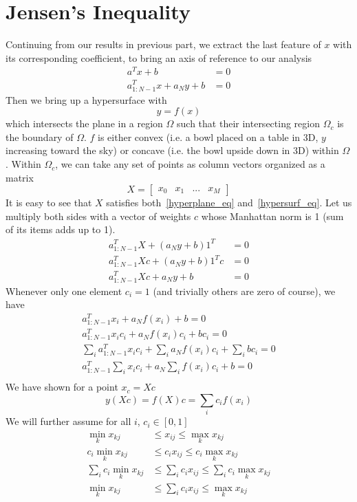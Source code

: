 \documentclass{book}
\numberwithin{equation}{subsection}
\begin{document}
\section{Jensen's Inequality}
Continuing from our results in previous part, we extract the last feature of $x$ with its corresponding coefficient, to bring an axis of reference to our analysis
\begin{align}
    a^Tx+b &= 0\\
    a_{1:N-1}^Tx+a_Ny+b &= 0 \label{hyperplane_eq}
\end{align}
Then we bring up a hypersurface with 
\begin{equation}
    y=f(x) \label{hypersurf_eq}
\end{equation}
which intersects the plane in a region $\Omega$ such that their intersecting region $\Omega_c$ is the boundary of $\Omega$. $f$ is either convex (i.e. a bowl placed on a table in 3D, $y$ increasing toward the sky) or concave (i.e. the bowl upside down in 3D) within $\Omega$. Within $\Omega_c$, we can take any set of points as column vectors organized as a matrix
$$
X = \begin{bmatrix}
    x_0 & x_1 & ... & x_M
\end{bmatrix}
$$
It is easy to see that $X$ satisfies both~\ref{hyperplane_eq} and~\ref{hypersurf_eq}. Let us multiply both sides with a vector of weights $c$ whose Manhattan norm is 1 (sum of its items adds up to 1). 
\begin{align}
    a_{1:N-1}^TX+(a_Ny+b)1^T &= 0\\
    a_{1:N-1}^TXc+(a_Ny+b)1^Tc &= 0\\
    a_{1:N-1}^TXc+a_Ny+b &= 0
\end{align}
Whenever only one element $c_i=1$ (and trivially others are zero of course), we have
\begin{align}
    a_{1:N-1}^Tx_i+a_Nf(x_i)+b = 0\\
    a_{1:N-1}^Tx_ic_i+a_Nf(x_i)c_i+bc_i = 0\\
    \sum_i a_{1:N-1}^Tx_ic_i+\sum_i a_Nf(x_i)c_i+\sum_i bc_i = 0\\
    a_{1:N-1}^T\sum_i x_ic_i+a_N\sum_i f(x_i)c_i+b = 0\\
\end{align}
We have shown for a point $x_c=Xc$ 
\begin{equation}
    y(Xc)=f(X)c=\sum_i c_if(x_i)
\end{equation}
We will further assume for all $i$, $c_i \in [0,1]$
\begin{align}
    \min_kx_{kj} &\leq x_{ij} \leq \max_kx_{kj}\\
    c_i\min_kx_{kj} &\leq c_ix_{ij} \leq c_i\max_kx_{kj}\\
    \sum_i c_i\min_kx_{kj} &\leq \sum_i c_ix_{ij} \leq \sum_i c_i\max_kx_{kj}\\
    \min_kx_{kj} &\leq \sum_i c_ix_{ij} \leq \max_kx_{kj}\\
\end{align}
\end{document}
